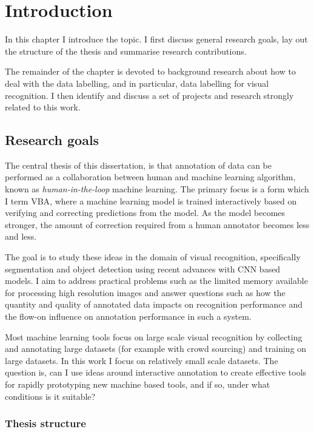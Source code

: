 \chapter{Introduction}

In this chapter I introduce the topic. I first discuss general research goals, lay out the structure of the thesis and summarise research contributions. 

The remainder of the chapter is devoted to background research about  how to deal with the data labelling, and in particular, data labelling for visual recognition. I then identify and discuss a set of projects and research strongly related to this work. 


\section{Research goals}
\label{sec:research_goals}

The central thesis of this dissertation, is that annotation of data can be performed as a collaboration between human and machine learning algorithm, known as \emph{human-in-the-loop} machine learning. The primary focus is a form which I term \gls{VBA}, where a machine learning model is trained interactively based on verifying and correcting predictions from the model. As the model becomes stronger, the amount of correction required from a human annotator becomes less and less. 

The goal is to study these ideas in the domain of visual recognition, specifically segmentation and object detection using recent advances with \gls{CNN} based models. I aim to address practical problems such as the limited memory available for processing high resolution images and answer questions such as how the quantity and quality of annotated data impacts on recognition performance and the flow-on influence on annotation performance in such a system.

Most machine learning tools focus on large scale visual recognition by collecting and annotating large datasets (for example with crowd sourcing) and training on large datasets. In this work I focus on relatively small scale datasets. The question is, can I use ideas around interactive annotation to create effective tools for rapidly prototyping new machine based tools, and if so, under what conditions is it suitable?

\subsection {Thesis structure} 

